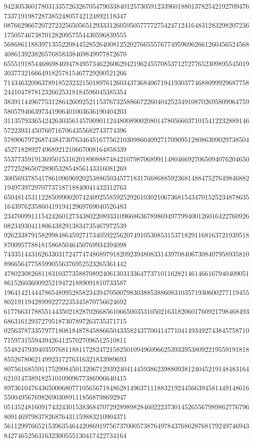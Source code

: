 \begin{DoxyCode}
      942305360178031335726326705479033840125730591233960188013782542192709476733719198728738524805742124892118347
      087662966720727232565056512933312605950577772754247124164831283298207236175057467387012820957554430596839555
      568686118839713552208445285264008125202766555767749596962661260456524568408613923826576858338469849977872670
      655519185446869846947849573462260629421962455708537127277652309895545019303773216664918257815467729200521266
      714346320963789185232321501897612603437368406719419303774688099929687758244104787812326625318184596045385354
      383911449677531286426092521153767325886672260404252349108702695809964759580579466397341906401003636190404203
      311357933654242630356145700901124480089002080147805660371015412232889146572239314507607167064355682743774396
      578906797268743847307634645167756210309860409271709095128086309029738504452718289274968921210667008164858339
      553773591913695015316201890888748421079870689911480466927065094076204650277252865072890532854856143316081269
      300569378541786109696920253886503457718317668688592368148847527649846882194973972970773718718840041432312763
      650481453112285099002074240925585925292610302106736815434701525234878635164397623586041919412969769040526483
      234700991115424260127343802208933109668636789869497799400126016422760926082349304118064382913834735467972539
      926233879158299848645927173405922562074910530853153718291168163721939518870095778818158685046450769934394098
      743351443162633031724774748689791820923948083314397084067308407958935810896656477585990556376952523265361442
      478023082681183103773588708924061303133647737101162821461466167940409051861526036009252194721889091810733587
      196414214447865489952858234394705007983038853886083103571930600277119455802191194289992272235345870756624692
      617766317885514435021828702668561066500353105021631820601760921798468493686316129372795187307897263735371715
      025637873357977180818487845886650433582437700414771041493492743845758710715973155943942641257027096512510811
      554824793940359768118811728247215825010949609662539339538092219559191818855267806214992317276316321833989693
      807561685591175299845013206712939240414459386239880938124045219148483164621014738918251010909677386906640415
      897361047643650006807710565671848628149637111883219244566394581449148616550049567698269030891118568798692947
      051352481609174324301538368470729289898284602223730145265567989862776796809146979837826876431159883210904371
      561129976652153963546442086919756737000573876497843768628768179249746943842746525631632300555130417422734164

\end{DoxyCode}
